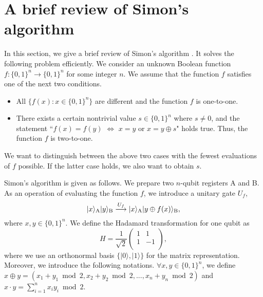 \documentclass[12pt]{article}
\begin{document}
\section{\label{section-review-Simon}A brief review of Simon's algorithm}
In this section,
we give a brief review of Simon's algorithm
\cite{Simon1997,Aharonov1999}.
It solves the following problem efficiently.
We consider an unknown Boolean function
$f:\{0,1\}^{n}\to\{0,1\}^{n}$
for some integer $n$.
We assume that the function $f$ satisfies one of the next two conditions.
\begin{itemize}
\item
All $\{f(x):x\in\{0,1\}^{n}\}$ are different and the function $f$ is one-to-one.
\item
There exists a certain nontrivial value $s\in\{0,1\}^{n}$ where $s\neq 0$,
and the statement
``$f(x)=f(y)$ $\Leftrightarrow$ $x=y$ or $x=y\oplus s$"
holds true.
Thus,
the function $f$ is two-to-one.
\end{itemize}
We want to distinguish between the above two cases with the fewest evaluations of $f$ possible.
If the latter case holds,
we also want to obtain $s$.

Simon's algorithm
is given as follows.
We prepare two $n$-qubit registers A and B.
As an operation of evaluating the function $f$,
we introduce a unitary gate $U_{f}$,
\begin{equation}
|x\rangle_{\mbox{\scriptsize A}}
|y\rangle_{\mbox{\scriptsize B}}
\stackrel{U_{f}}{\longrightarrow}
|x\rangle_{\mbox{\scriptsize A}}
|y\oplus f(x)\rangle_{\mbox{\scriptsize B}},
\label{U_f-gate_01}
\end{equation}
where
$x,y\in\{0,1\}^{n}$.
We define the Hadamard transformation for one qubit as
\begin{equation}
H
=
\frac{1}{\sqrt{2}}
\left(
\begin{array}{cc}
1 & 1 \\
1 & -1 \\
\end{array}
\right),
\end{equation}
where we use an orthonormal basis
$\{|0\rangle,|1\rangle\}$
for the matrix representation.
Moreover,
we introduce the following notations.
$\forall x,y\in\{0,1\}^{n}$,
we define
$x\oplus y=(
x_{1}+y_{1} \bmod 2,
x_{2}+y_{2} \bmod 2,
...,
x_{n}+y_{n} \bmod 2)$
and
$x\cdot y=\sum_{i=1}^{n}x_{i}y_{i} \bmod 2$.
\end{document}
